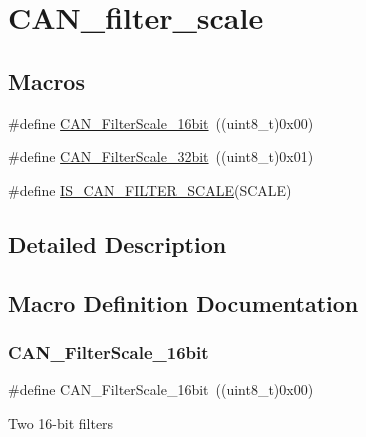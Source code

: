 \hypertarget{group___c_a_n__filter__scale}{}\section{C\+A\+N\+\_\+filter\+\_\+scale}
\label{group___c_a_n__filter__scale}
\subsection*{Macros}
\begin{DoxyCompactItemize}
\item 
\#define \mbox{\hyperlink{group___c_a_n__filter__scale_ga9e0493937e73bcf9a4127eef2f255a95}{C\+A\+N\+\_\+\+Filter\+Scale\+\_\+16bit}}~((uint8\+\_\+t)0x00)
\item 
\#define \mbox{\hyperlink{group___c_a_n__filter__scale_gac63dfb0e11713c59268ee9f4aebab60e}{C\+A\+N\+\_\+\+Filter\+Scale\+\_\+32bit}}~((uint8\+\_\+t)0x01)
\item 
\#define \mbox{\hyperlink{group___c_a_n__filter__scale_gaf64c93166af0eb5ec7e804116f10783a}{I\+S\+\_\+\+C\+A\+N\+\_\+\+F\+I\+L\+T\+E\+R\+\_\+\+S\+C\+A\+LE}}(S\+C\+A\+LE)
\end{DoxyCompactItemize}


\subsection{Detailed Description}


\subsection{Macro Definition Documentation}
\mbox{\label{group___c_a_n__filter__scale_ga9e0493937e73bcf9a4127eef2f255a95}} 
\subsubsection{\texorpdfstring{CAN\_FilterScale\_16bit}{CAN\_FilterScale\_16bit}}
{\footnotesize\ttfamily \#define C\+A\+N\+\_\+\+Filter\+Scale\+\_\+16bit~((uint8\+\_\+t)0x00)}

Two 16-\/bit filters \mbox{\label{group___c_a_n__filter__scale_gac63dfb0e11713c59268ee9f4aebab60e}} 
